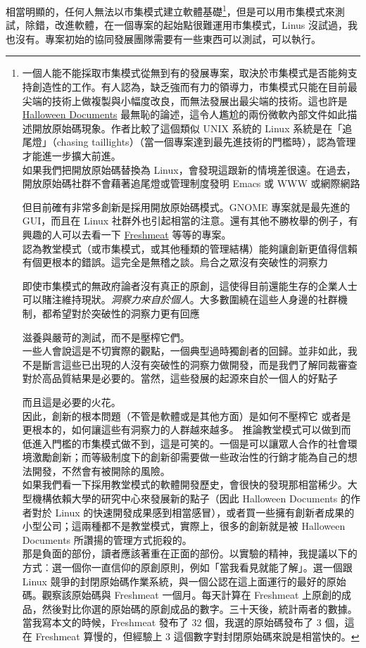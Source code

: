 \documentclass[12pt,]{article}
\makeatletter
\newcommand*{\shifttext}[2]{%
  \settowidth{\@tempdima}{#2}%
  \makebox[\@tempdima]{\hspace*{#1}#2}%
}
\makeatother
\begin{document}
相當明顯的，任何人無法以市集模式建立軟體基礎\footnote{一個人能不能採取市集模式從無到有的發展專案，取決於市集模式是否能夠支持創造性的工作。有人認為，缺乏強而有力的領導力，市集模式只能在目前最尖端的技術上做複製與小幅度改良，而無法發展出最尖端的技術。這也許是
  \href{http://www.opensource.org/halloween/}{Halloween Documents}
  最無恥的論述，這令人尷尬的兩份微軟內部文件如此描述開放原始碼現象。作者比較了這個類似
  UNIX 系統的 Linux 系統是在「追尾燈」（chasing
  taillights）（當一個專案達到最先進技術的門檻時），認為管理才能進一步擴大前進。\\如果我們把開放原始碼替換為
  Linux，會發現這跟新的情境差很遠。在過去，開放原始碼社群不會藉著追尾燈或管理制度發明
  Emacs 或 WWW 或網際網路 \shifttext{1pt}{---}\shifttext{-1pt}{---}
  但目前確有非常多創新是採用開放原始碼模式。GNOME 專案就是最先進的
  GUI，而且在 Linux
  社群外也引起相當的注意。還有其他不勝枚舉的例子，有興趣的人可以去看一下
  \href{http://freshmeat.net/}{Freshmeat}
  等等的專案。\\認為教堂模式（或市集模式，或其他種類的管理結構）能夠讓創新更值得信賴有個更根本的錯誤。這完全是無稽之談。烏合之眾沒有突破性的洞察力
  \shifttext{1pt}{---}\shifttext{-1pt}{---}
  即使市集模式的無政府論者沒有真正的原創，這使得目前還能生存的企業人士可以賭注維持現狀。\emph{洞察力來自於個人}。大多數圍繞在這些人身邊的社群機制，都希望對於突破性的洞察力更有回應
  \shifttext{1pt}{---}\shifttext{-1pt}{---}
  滋養與嚴苛的測試，而不是壓榨它們。\\一些人會說這是不切實際的觀點，一個典型過時獨創者的回歸。並非如此，我不是斷言這些已出現的人沒有突破性的洞察力做開發，而是我們了解同裁審查對於高品質結果是必要的。當然，這些發展的起源來自於一個人的好點子
  \shifttext{1pt}{---}\shifttext{-1pt}{---}
  而且這是必要的火花。\\因此，創新的根本問題（不管是軟體或是其他方面）是如何不壓榨它
  \shifttext{1pt}{---}\shifttext{-1pt}{---} 或者是更根本的，如何讓這些有洞察力的人群越來越多。
  推論教堂模式可以做到而低進入門檻的市集模式做不到，這是可笑的。一個是可以讓眾人合作的社會環境激勵創新；而等級制度下的創新卻需要做一些政治性的行銷才能為自己的想法開發，不然會有被開除的風險。\\如果我們看一下採用教堂模式的軟體開發歷史，會很快的發現那相當稀少。大型機構依賴大學的研究中心來發展新的點子（因此
  Halloween Documents 的作者對於 Linux
  的快速開發成果感到相當感冒），或者買一些擁有創新者成果的小型公司；這兩種都不是教堂模式，實際上，很多的創新就是被
  Halloween Documents
  所讚揚的管理方式扼殺的。\\那是負面的部份，讀者應該著重在正面的部份。以實驗的精神，我提議以下的方式︰選一個你一直信仰的原創原則，例如「當我看見就能了解」。選一個跟
  Linux
  競爭的封閉原始碼作業系統，與一個公認在這上面運行的最好的原始碼。觀察該原始碼與
  Freshmeat 一個月。每天計算在 Freshmeat
  上原創的成品，然後對比你選的原始碼的原創成品的數字。三十天後，統計兩者的數據。\\當我寫本文的時候，Freshmeat
  發布了 32 個，我選的原始碼發布了 3 個，這在 Freshmeat 算慢的，但經驗上 3
  這個數字對封閉原始碼來說是相當快的。}，但是可以用市集模式來測試，除錯，改進軟體，在一個專案的起始點很難運用市集模式，Linus
沒試過，我也沒有。專案初始的協同發展團隊需要有一些東西可以測試，可以執行。
\end{document}
